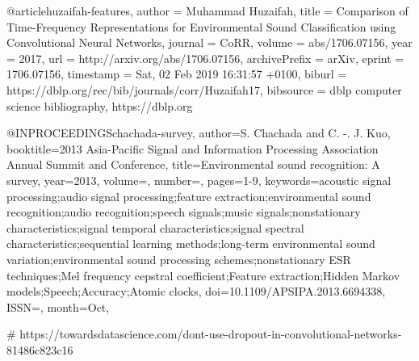 @article{huzaifah-features,
  author    = {Muhammad Huzaifah},
  title     = {Comparison of Time-Frequency Representations for Environmental Sound
               Classification using Convolutional Neural Networks},
  journal   = {CoRR},
  volume    = {abs/1706.07156},
  year      = {2017},
  url       = {http://arxiv.org/abs/1706.07156},
  archivePrefix = {arXiv},
  eprint    = {1706.07156},
  timestamp = {Sat, 02 Feb 2019 16:31:57 +0100},
  biburl    = {https://dblp.org/rec/bib/journals/corr/Huzaifah17},
  bibsource = {dblp computer science bibliography, https://dblp.org}
}


@INPROCEEDINGS{chachada-survey,
author={S. {Chachada} and C. -. J. {Kuo}},
booktitle={2013 Asia-Pacific Signal and Information Processing Association Annual Summit and Conference},
title={Environmental sound recognition: A survey},
year={2013},
volume={},
number={},
pages={1-9},
keywords={acoustic signal processing;audio signal processing;feature extraction;environmental sound recognition;audio recognition;speech signals;music signals;nonstationary characteristics;signal temporal characteristics;signal spectral characteristics;sequential learning methods;long-term environmental sound variation;environmental sound processing schemes;nonstationary ESR techniques;Mel frequency cepstral coefficient;Feature extraction;Hidden Markov models;Speech;Accuracy;Atomic clocks},
doi={10.1109/APSIPA.2013.6694338},
ISSN={},
month={Oct},}


# https://towardsdatascience.com/dont-use-dropout-in-convolutional-networks-81486c823c16

